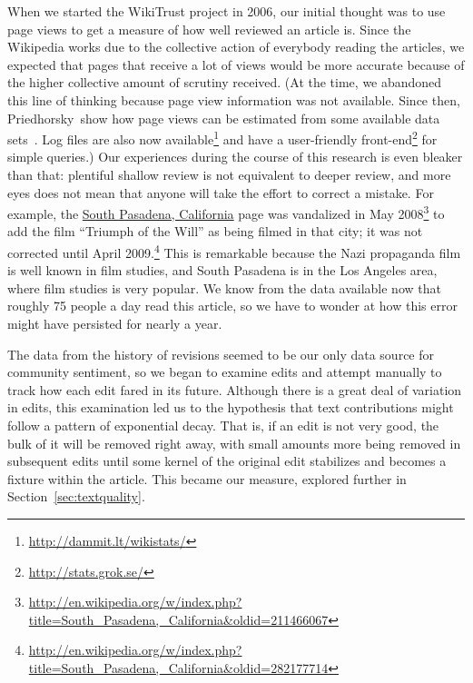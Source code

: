 When we started the WikiTrust project in 2006, our initial thought was to
use page views to get a measure of how well reviewed an article is.
Since the Wikipedia works due to the collective action of everybody
reading the articles, we expected that pages that receive a lot of
views would be more accurate because of the higher collective amount
of scrutiny received.
(At the time, we abandoned this line of thinking because page view
information was not available.
Since then, Priedhorsky~\etal show how page views can be estimated
from some available data sets~\cite{Priedhorsky2007}.
Log files are also now
available\footnote{\url{http://dammit.lt/wikistats/}} and
have a user-friendly front-end\footnote{\url{http://stats.grok.se/}}
for simple queries.)
Our experiences during the course of this research is even
bleaker than that: plentiful shallow review is not equivalent to
deeper review, and more eyes does not mean that anyone will take
the effort to correct a mistake.
For example, the \underline{South Pasadena, California} page was vandalized
in May 2008\footnote{\url{http://en.wikipedia.org/w/index.php?title=South_Pasadena,_California&oldid=211466067}}
to add the film ``Triumph of the Will'' as being filmed in that city;
it was not corrected until
April 2009.\footnote{\url{http://en.wikipedia.org/w/index.php?title=South_Pasadena,_California&oldid=282177714}}
This is remarkable because the Nazi propaganda film is well known in film studies,
and South Pasadena is in the Los Angeles area,
where film studies is very popular.
We know from the data available now that roughly 75 people a day
read this article, so we have to wonder at how this error might
have persisted for nearly a year.

The data from the history of revisions seemed to be our only
data source for community sentiment, so
we began to examine edits and attempt manually to track how each
edit fared in its future.
Although there is a great deal of variation in edits, this examination
led us to the hypothesis that text contributions might follow a pattern
of exponential decay.
That is, if an edit is not very good, the bulk of it will be removed
right away, with small amounts more being removed in subsequent edits
until some kernel of the original edit stabilizes and becomes a fixture
within the article.
This became our  measure, explored further in
Section~\ref{sec:textquality}.

